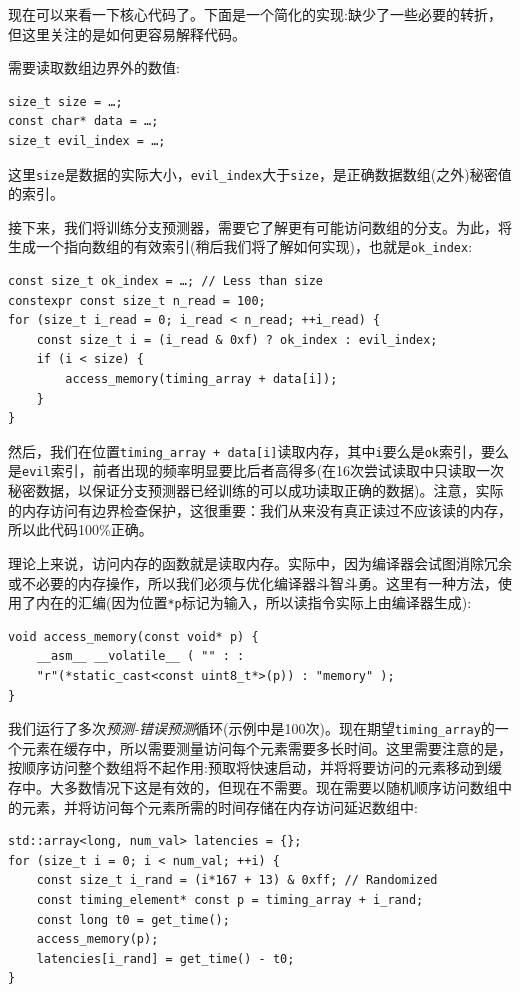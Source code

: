 现在可以来看一下核心代码了。下面是一个简化的实现:缺少了一些必要的转折，但这里关注的是如何更容易解释代码。

需要读取数组边界外的数值:

\begin{lstlisting}[style=styleCXX]
size_t size = …;
const char* data = …;
size_t evil_index = …;
\end{lstlisting}

这里\texttt{size}是数据的实际大小，\texttt{evil\_index}大于\texttt{size}，是正确数据数组(之外)秘密值的索引。

接下来，我们将训练分支预测器，需要它了解更有可能访问数组的分支。为此，将生成一个指向数组的有效索引(稍后我们将了解如何实现)，也就是\texttt{ok\_index}:

\begin{lstlisting}[style=styleCXX]
const size_t ok_index = …; // Less than size
constexpr const size_t n_read = 100;
for (size_t i_read = 0; i_read < n_read; ++i_read) {
	const size_t i = (i_read & 0xf) ? ok_index : evil_index;
	if (i < size) {
		access_memory(timing_array + data[i]);
	}
}
\end{lstlisting}

然后，我们在位置\texttt{timing\_array + data[i]}读取内存，其中\texttt{i}要么是\texttt{ok}索引，要么是\texttt{evil}索引，前者出现的频率明显要比后者高得多(在16次尝试读取中只读取一次秘密数据，以保证分支预测器已经训练的可以成功读取正确的数据)。注意，实际的内存访问有边界检查保护，这很重要：我们从来没有真正读过不应该读的内存，所以此代码100\%正确。

理论上来说，访问内存的函数就是读取内存。实际中，因为编译器会试图消除冗余或不必要的内存操作，所以我们必须与优化编译器斗智斗勇。这里有一种方法，使用了内在的汇编(因为位置\texttt{*p}标记为输入，所以读指令实际上由编译器生成):

\begin{lstlisting}[style=styleCXX]
void access_memory(const void* p) {
	__asm__ __volatile__ ( "" : :
	"r"(*static_cast<const uint8_t*>(p)) : "memory" );
}
\end{lstlisting}

我们运行了多次\textit{预测-错误预测}循环(示例中是100次)。现在期望\texttt{timing\_array}的一个元素在缓存中，所以需要测量访问每个元素需要多长时间。这里需要注意的是，按顺序访问整个数组将不起作用:预取将快速启动，并将将要访问的元素移动到缓存中。大多数情况下这是有效的，但现在不需要。现在需要以随机顺序访问数组中的元素，并将访问每个元素所需的时间存储在内存访问延迟数组中:

\begin{lstlisting}[style=styleCXX]
std::array<long, num_val> latencies = {};
for (size_t i = 0; i < num_val; ++i) {
	const size_t i_rand = (i*167 + 13) & 0xff; // Randomized
	const timing_element* const p = timing_array + i_rand;
	const long t0 = get_time();
	access_memory(p);
	latencies[i_rand] = get_time() - t0;
}
\end{lstlisting}

